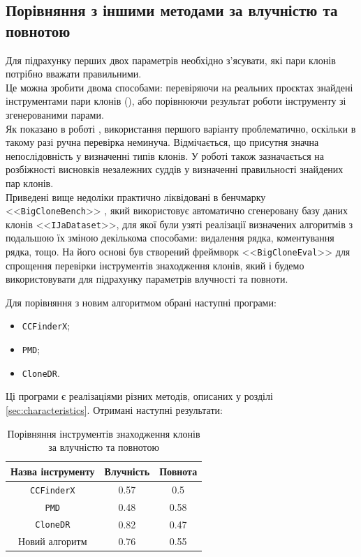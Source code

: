 \documentclass[a4paper, 14pt]{article}
\begin{document}
\subsection{Порівняння з іншими методами за влучністю та повнотою}
\par Для підрахунку перших двох параметрів необхідно з'ясувати, які пари клонів потрібно вважати правильними. \\ 
Це можна зробити двома способами: перевіряючи на реальних проєктах знайдені інструментами пари клонів (\cite{Bellon07}), або порівнюючи результат роботи інструменту зі згенерованими парами. \\ 
Як показано в роботі \cite{Roy18}, використання першого варіанту проблематично, оскільки в такому разі ручна перевірка неминуча. Відмічається, що присутня значна непослідовність у визначенні типів клонів. У роботі \cite{Charpentier15} також зазначається на розбіжності висновків незалежних суддів у визначенні правильності знайдених пар клонів. \\
Приведені вище недоліки практично ліквідовані в бенчмарку <<\verb|BigCloneBench|>> \cite{Svajlenko14}, який використовує автоматично сгенеровану базу даних клонів <<\verb|IJaDataset|>>, для якої були узяті реалізації визначених алгоритмів з подальшою їх зміною декількома способами: видалення рядка, коментування рядка, тощо. На його основі був створений фреймворк <<\verb|BigCloneEval|>> для спрощення перевірки інструментів знаходження клонів, який і будемо використовувати для підрахунку параметрів влучності та повноти. \par
Для порівняння з новим алгоритмом обрані наступні програми:
\begin{itemize}
\item \verb|CCFinderX|;
\item \verb|PMD|;
\item \verb|CloneDR|.
\end{itemize}
Ці програми є реалізаціями різних методів, описаних у розділі \ref{sec:characteristics}.
Отримані наступні результати: \\
\begin{table}[ht]
\centering
\caption{\centering Порівняння інструментів знаходження клонів за влучністю та повнотою}
 \begin{tabular}{| c | c | c |} 
 \hline
 Назва інструменту & Влучність & Повнота \\ [0.5ex] 
 \hline
 \verb|CCFinderX| & 0.57 & 0.5 \\ 
 \hline
 \verb|PMD| & 0.48 & 0.58 \\
 \hline
 \verb|CloneDR| & 0.82 & 0.47 \\
 \hline
 Новий алгоритм & 0.76 & 0.55 \\ [1ex]
 \hline
\end{tabular} 
\end{table} \\
\end{document}
